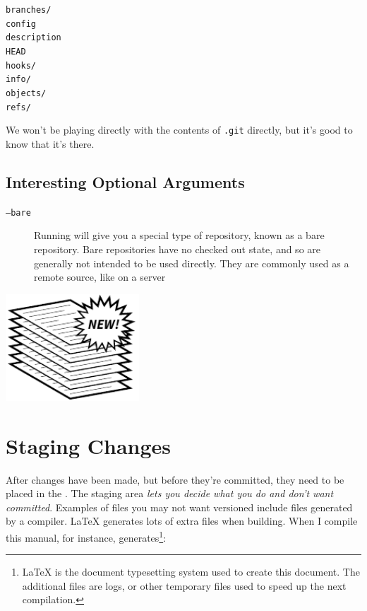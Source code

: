 \documentclass[11pt,letterpaper,twoside]{report}
\begin{document}
\begin{multicols}{4}
\noindent
\texttt{branches/}\\
\texttt{config}\\
\texttt{description}\\
\texttt{HEAD}\\
\texttt{hooks/}\\
\texttt{info/}\\
\texttt{objects/}\\
\texttt{refs/}
\end{multicols}

We won't be playing directly with the contents of \texttt{.git} directly, but
it's good to know that it's there.

\section{Interesting Optional Arguments}

\begin{description}
\item[\texttt{--bare}]
    Running  will give you a special type of repository,
    known as a bare repository. Bare repositories have no checked out state, and
    so are generally not intended to be used directly. They are commonly used as
    a remote source, like on a server
\end{description}

\vspace{\fill}
\begin{flushright}
\includegraphics[height=4cm]{resources/new_stack_abstract.pdf}
\end{flushright}
\vspace*{\fill}

\chapter{Staging Changes}

After changes have been made, but before they're committed, they need to be
placed in the . The staging area \emph{lets you decide what
you do and don't want committed}. Examples of files you may not want
versioned include files generated by a compiler. \LaTeX{} generates lots of
extra files when building. When I compile this manual, for instance,
 generates\footnote{\LaTeX{} is the document typesetting system
used to create this document. The additional files are logs, or other temporary
files used to speed up the next compilation.}:
\end{document}
